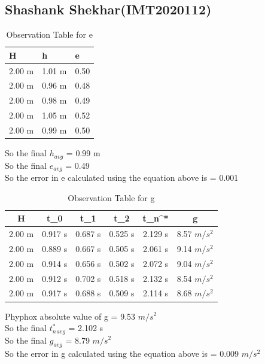 \documentclass[11pt]{scrartcl} %
\begin{document}
\newpage
\subsection{Shashank Shekhar(IMT2020112)}

\begin{table}[h] %
	\centering %
	\begin{tabular}{l l l}
		\toprule
		\textbf{H} & \textbf{h} & \textbf{e} \\
		\midrule
		2.00 m & 1.01 m & 0.50\\
        2.00 m & 0.96 m  & 0.48\\
        2.00 m & 0.98 m  & 0.49\\
        2.00 m & 1.05 m & 0.52 \\
        2.00 m & 0.99 m & 0.50 \\
		\bottomrule
	\end{tabular}
	\caption{Observation Table for e}
\end{table}
So the final $h_{avg}$ = 0.99 m\\
So the final $e_{avg}$ = 0.49\\
So the error in e calculated using the equation above is  = 0.001

\begin{table}[h]
\centering
\begin{tabular}{||c c c c c c||} 
\toprule
 \hline
 H & t_0 & t_1 & t_2 & t_n^* & g \\ [0.5ex] 
 \midrule
 \hline\hline
 2.00 m & 0.917 s & 0.687 s  & 0.525 s & 2.129 s & 8.57 $m/s^2$  \\ 
 \hline
 2.00 m & 0.889 s & 0.667 s & 0.505 s & 2.061 s & 9.14 $m/s^2$  \\
 \hline 
 2.00 m & 0.914 s & 0.656 s & 0.502 s & 2.072 s  & 9.04 $m/s^2$   \\
 \hline
 2.00 m & 0.912 s & 0.702 s & 0.518 s & 2.132 s  & 8.54 $m/s^2$   \\
 \hline
 2.00 m & 0.917 s & 0.688 s & 0.509 s & 2.114 s  & 8.68 $m/s^2$  \\ 
 [1ex]
 \bottomrule
 \hline
\end{tabular}
\caption{Observation Table for g}
\end{table}
Phyphox absolute value of g = 9.53 $m/s^2$\\
So the final $t_n^*_{avg}$ = 2.102 s\\
So the final $g_{avg}$ = 8.79 $m/s^2$\\
So the error in g calculated using the equation above is  = 0.009 $m/s^2$\\

\newpage
\end{document}

